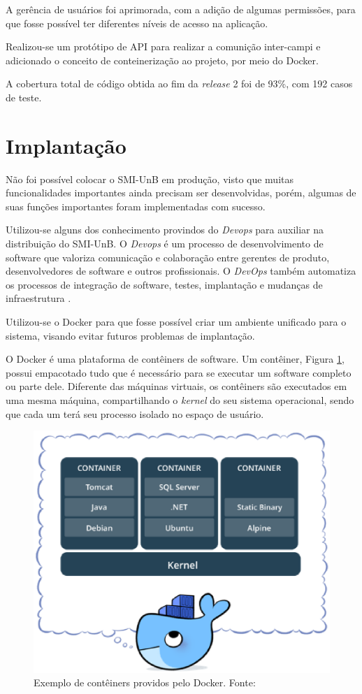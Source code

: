 A gerência de usuários foi aprimorada, com a adição de algumas permissões, para que fosse possível ter diferentes níveis de acesso na aplicação.

Realizou-se um protótipo de API para realizar a comunição inter-campi e adicionado o conceito de conteinerização ao projeto, por meio do Docker.

A cobertura total de código obtida ao fim da \textit{release} 2 foi de 93\%, com 192 casos de teste.

\section{Implantação}
Não foi possível colocar o SMI-UnB em produção, visto que muitas funcionalidades importantes ainda precisam ser desenvolvidas, porém, algumas de suas funções importantes foram implementadas com sucesso.

Utilizou-se alguns dos conhecimento provindos do \textit{Devops} para auxiliar na distribuição do SMI-UnB. O \textit{Devops} é um processo de desenvolvimento de software que valoriza comunicação e colaboração entre gerentes de produto, desenvolvedores de software e outros profissionais. O \textit{DevOps} também automatiza os processos de integração de software, testes, implantação e mudanças de infraestrutura \cite{loukides_2012}.

Utilizou-se o Docker \cite{docker} para que fosse possível criar um ambiente unificado para o sistema, visando evitar futuros problemas de implantação.

O Docker é uma plataforma de contêiners de software. Um contêiner, Figura \ref{container}, possui empacotado tudo que é necessário para se executar um software completo ou parte dele. Diferente das máquinas virtuais, os contêiners são executados em uma mesma máquina, compartilhando o \textit{kernel} do seu sistema operacional, sendo que cada um terá seu processo isolado no espaço de usuário.

\begin{figure}[!h]
    \centering
    \includegraphics[keepaspectratio=true,scale=0.8]{figuras/container.eps}
    \caption{Exemplo de contêiners providos pelo Docker. Fonte: \cite{docker} }
    \label{container}
\end{figure}

